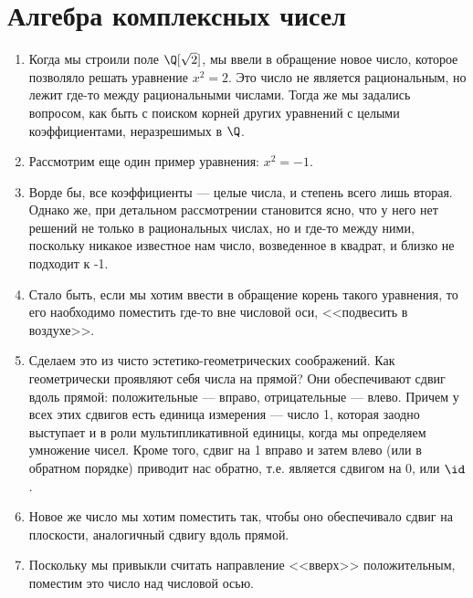 


\section{Алгебра комплексных чисел}


\begin{enumerate}
\item Когда мы строили поле $\Q[\sqrt 2]$, мы ввели в обращение новое число, которое позволяло решать уравнение $x^2=2$. Это число не является рациональным, но лежит где-то между рациональными числами. Тогда же мы задались вопросом, как быть с поиском корней других уравнений с целыми коэффициентами, неразрешимых в $\Q$.
\item Рассмотрим еще один пример уравнения: $x^2=-1$.
\item Ворде бы, все коэффициенты --- целые числа, и степень всего лишь вторая. Однако же, при детальном рассмотрении становится ясно, что у него нет решений не только в рациональных числах, но и где-то между ними, поскольку никакое известное нам число, возведенное в квадрат, и близко не подходит к -1.
\item Стало быть, если мы хотим ввести в обращение корень такого уравнения, то его наобходимо поместить где-то вне числовой оси, <<подвесить в воздухе>>.
\item Сделаем это из чисто эстетико-геометрических соображений. Как геометрически проявляют себя числа на прямой? Они обеспечивают сдвиг вдоль прямой: положительные --- вправо, отрицательные --- влево. Причем у всех этих сдвигов есть единица измерения --- число 1, которая заодно выступает и в роли мультипликативной единицы, когда мы определяем умножение чисел. Кроме того, сдвиг на 1 вправо и затем влево (или в обратном порядке) приводит нас обратно, т.е. является сдвигом на 0, или $\id$.
\item Новое же число мы хотим поместить так, чтобы оно обеспечивало сдвиг на плоскости, аналогичный сдвигу вдоль прямой.
\item Поскольку мы привыкли считать направление <<вверх>> положительным, поместим это число над числовой осью.

\end{enumerate}
